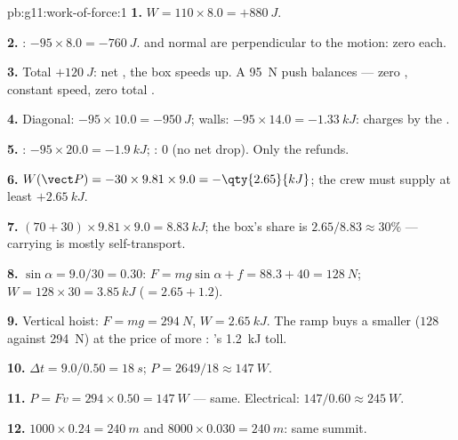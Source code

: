 \begin{solution}{pb:g11:work-of-force:1}
\textbf{1.} $W = 110 \times 8.0 = +\qty{880}{J}$.

\textbf{2.} : $-95 \times 8.0 = -\qty{760}{J}$.  and
normal  are perpendicular to the motion: zero each.

\textbf{3.} Total $+\qty{120}{J}$: net , the box speeds up.
A \qty{95}{N} push balances  --- zero , constant
speed, zero total .

\textbf{4.} Diagonal: $-95 \times 10.0 = -\qty{950}{J}$; walls:
$-95 \times 14.0 = -\qty{1.33}{kJ}$:  charges by the .

\textbf{5.} : $-95 \times 20.0 = -\qty{1.9}{kJ}$; :
$0$ (no net drop). Only the  refunds.

\textbf{6.} $W(\vect P) = -30 \times 9.81 \times 9.0 =
-\qty{2.65}{kJ}$; the crew must supply at least $+\qty{2.65}{kJ}$.

\textbf{7.} $(70 + 30) \times 9.81 \times 9.0 = \qty{8.83}{kJ}$; the
box's share is $2.65/8.83 \approx 30\%$ --- carrying is mostly
self-transport.

\textbf{8.} $\sin\alpha = 9.0/30 = 0.30$:
$F = mg\sin\alpha + f = 88.3 + 40 = \qty{128}{N}$;
$W = 128 \times 30 = \qty{3.85}{kJ}$ ($= 2.65 + 1.2$).

\textbf{9.} Vertical hoist: $F = mg = \qty{294}{N}$,
$W = \qty{2.65}{kJ}$. The ramp buys a smaller  ($128$ against
\qty{294}{N}) at the price of more : 's \qty{1.2}{kJ}
toll.

\textbf{10.} $\Delta t = 9.0/0.50 = \qty{18}{s}$;
$P = 2649/18 \approx \qty{147}{W}$.

\textbf{11.} $P = Fv = 294 \times 0.50 = \qty{147}{W}$ --- same.
Electrical: $147/0.60 \approx \qty{245}{W}$.

\textbf{12.} $1000 \times 0.24 = \qty{240}{m}$ and
$8000 \times 0.030 = \qty{240}{m}$: same summit.


\end{solution}
